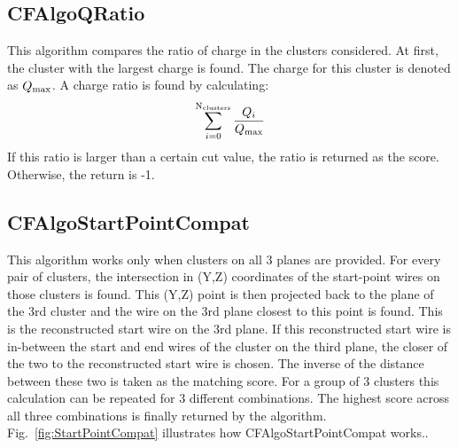 \documentclass{article}
\begin{document}
\newpage

\subsection{CFAlgoQRatio}
This algorithm compares the ratio of charge in the clusters considered. At first, the cluster with the largest charge is found. The charge for this cluster
is denoted as $Q_{{\rm max}}$. A charge ratio is found by calculating:
\begin{equation}
 \sum_{i=0}^{{\rm N_{clusters}}} \frac{Q_i}{Q_{{\rm max}}}
\end{equation}
If this ratio is larger than a certain cut value, the ratio is returned as the score. Otherwise, the return is -1.

\newpage

\subsection{CFAlgoStartPointCompat}
This algorithm works only when clusters on all 3 planes are provided. For every pair of clusters, the intersection in (Y,Z) coordinates of the start-point
wires on those clusters is found. This (Y,Z) point is then projected back to the plane of the 3rd cluster and the wire on the 3rd plane closest to this point
is found. This is the reconstructed start wire on the 3rd plane. If this reconstructed start wire is in-between the start and end wires of the cluster
on the third plane, the closer of the two to the reconstructed start wire is chosen. The inverse of the distance between these two is taken as the matching
score. For a group of 3 clusters this calculation can be repeated for 3 different combinations. The highest score across all three combinations is finally
returned by the algorithm. Fig.~\ref{fig:StartPointCompat} illustrates how CFAlgoStartPointCompat works..
\end{document}
